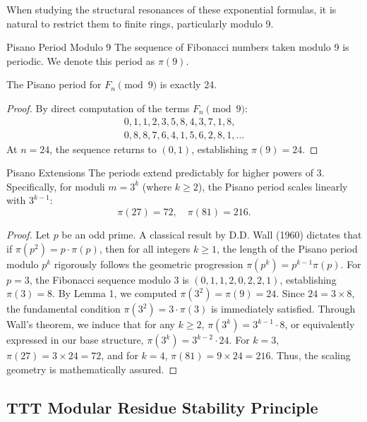 When studying the structural resonances of these exponential formulas, it is natural to restrict them to finite rings, particularly modulo 9.

\begin{definition}{Pisano Period Modulo 9}{}
	The sequence of Fibonacci numbers taken modulo 9 is periodic. We denote this period as $\pi(9)$. 
\end{definition}

\begin{lemma}{}{}
	The Pisano period for $F_n \pmod 9$ is exactly 24.
\end{lemma}
\begin{proof}
	By direct computation of the terms $F_n \pmod 9$:
	\[
	\begin{array}{l}
	0, 1, 1, 2, 3, 5, 8, 4, 3, 7, 1, 8, \\
	0, 8, 8, 7, 6, 4, 1, 5, 6, 2, 8, 1, \dots
	\end{array}
	\]
	At $n = 24$, the sequence returns to $(0, 1)$, establishing $\pi(9) = 24$.
\end{proof}

\begin{theorem}{Pisano Extensions}{}
	The periods extend predictably for higher powers of 3. Specifically, for moduli $m = 3^k$ (where $k \ge 2$), the Pisano period scales linearly with $3^{k-1}$:
	\[
	\pi(27) = 72, \quad \pi(81) = 216.
	\]
\end{theorem}
\begin{proof}
	Let $p$ be an odd prime. A classical result by D.D. Wall (1960) dictates that if $\pi(p^2) = p \cdot \pi(p)$, then for all integers $k \ge 1$, the length of the Pisano period modulo $p^k$ rigorously follows the geometric progression $\pi(p^k) = p^{k-1}\pi(p)$. For $p = 3$, the Fibonacci sequence modulo $3$ is $(0, 1, 1, 2, 0, 2, 2, 1)$, establishing $\pi(3) = 8$. By Lemma 1, we computed $\pi(3^2) = \pi(9) = 24$. Since $24 = 3 \times 8$, the fundamental condition $\pi(3^2) = 3 \cdot \pi(3)$ is immediately satisfied. Through Wall's theorem, we induce that for any $k \ge 2$, $\pi(3^k) = 3^{k-1} \cdot 8$, or equivalently expressed in our base structure, $\pi(3^k) = 3^{k-2} \cdot 24$. For $k=3$, $\pi(27) = 3 \times 24 = 72$, and for $k=4$, $\pi(81) = 9 \times 24 = 216$. Thus, the scaling geometry is mathematically assured.
\end{proof}

\subsection{TTT Modular Residue Stability Principle}

